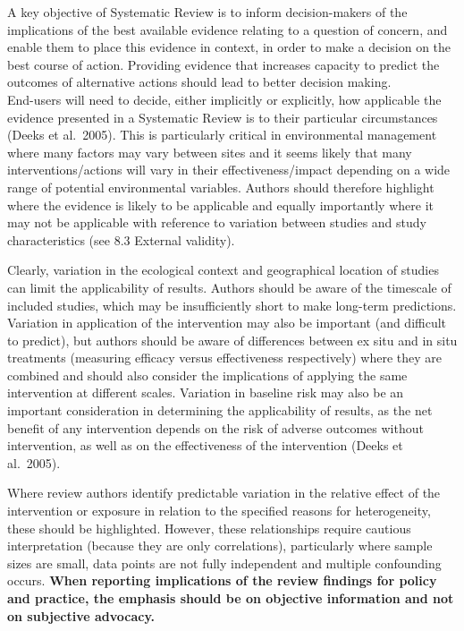 \documentclass[
  letterpaper,
  DIV=11,
  numbers=noendperiod]{scrreprt}
\begin{document}
A key objective of Systematic Review is to inform decision-makers of the
implications of the best available evidence relating to a question of
concern, and enable them to place this evidence in context, in order to
make a decision on the best course of action. Providing evidence that
increases capacity to predict the outcomes of alternative actions should
lead to better decision making.\\
End-users will need to decide, either implicitly or explicitly, how
applicable the evidence presented in a Systematic Review is to their
particular circumstances (Deeks et al.~2005). This is particularly
critical in environmental management where many factors may vary between
sites and it seems likely that many interventions/actions will vary in
their effectiveness/impact depending on a wide range of potential
environmental variables. Authors should therefore highlight where the
evidence is likely to be applicable and equally importantly where it may
not be applicable with reference to variation between studies and study
characteristics (see 8.3 External validity).

Clearly, variation in the ecological context and geographical location
of studies can limit the applicability of results. Authors should be
aware of the timescale of included studies, which may be insufficiently
short to make long-term predictions. Variation in application of the
intervention may also be important (and difficult to predict), but
authors should be aware of differences between ex situ and in situ
treatments (measuring efficacy versus effectiveness respectively) where
they are combined and should also consider the implications of applying
the same intervention at different scales. Variation in baseline risk
may also be an important consideration in determining the applicability
of results, as the net benefit of any intervention depends on the risk
of adverse outcomes without intervention, as well as on the
effectiveness of the intervention (Deeks et al.~2005).

Where review authors identify predictable variation in the relative
effect of the intervention or exposure in relation to the specified
reasons for heterogeneity, these should be highlighted. However, these
relationships require cautious interpretation (because they are only
correlations), particularly where sample sizes are small, data points
are not fully independent and multiple confounding occurs. \textbf{When
reporting implications of the review findings for policy and practice,
the emphasis should be on objective information and not on subjective
advocacy.}
\end{document}
